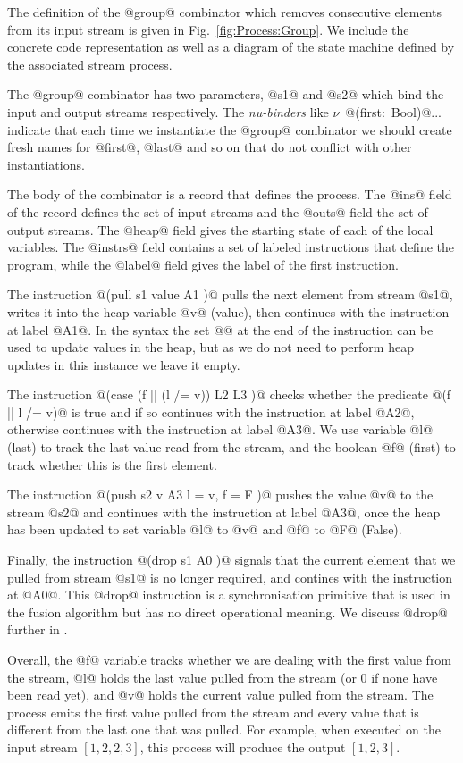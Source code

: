 The definition of the @group@ combinator which removes consecutive elements from its input stream is given in Fig.~\ref{fig:Process:Group}. We include the concrete code representation as well as a diagram of the state machine defined by the associated stream process.

The @group@ combinator has two parameters, @s1@ and @s2@ which bind the input and output streams respectively. The \emph{nu-binders} like \mbox{$\nu$ @(first: Bool)@...} indicate that each time we instantiate the @group@ combinator we should create fresh names for @first@, @last@ and so on that do not conflict with other instantiations. 

The body of the combinator is a record that defines the process. The @ins@ field of the record defines the set of input streams and the @outs@ field the set of output streams. The @heap@ field gives the starting state of each of the local variables. The @instrs@ field contains a set of labeled instructions that define the program, while the @label@ field gives the label of the first instruction. 

The instruction @(pull s1 value A1 {})@ pulls the next element from stream @s1@, writes it into the heap variable @v@ (value), then continues with the instruction at label @A1@. In the syntax the set @{}@ at the end of the instruction can be used to update values in the heap, but as we do not need to perform heap updates in this instance we leave it empty. 

The instruction @(case (f || (l /= v)) L2 {} L3 {})@ checks whether the predicate @(f || l /= v)@ is true and if so continues with the instruction at label @A2@, otherwise continues with the instruction at label @A3@. We use variable @l@ (last) to track the last value read from the stream, and the boolean @f@ (first) to track whether this is the first element.

The instruction @(push s2 v A3 { l = v, f = F })@ pushes the value @v@ to the stream @s2@ and continues with the instruction at label @A3@, once the heap has been updated to set variable @l@ to @v@ and @f@ to @F@ (False). 

Finally, the instruction @(drop s1 A0 {})@ signals that the current element that we pulled from stream @s1@ is no longer required, and contines with the instruction at @A0@. This @drop@ instruction is a synchronisation primitive that is used in the fusion algorithm but has no direct operational meaning. We discuss @drop@ further in . 

Overall, the @f@ variable tracks whether we are dealing with the first value from the stream, @l@ holds the last value pulled from the stream (or 0 if none have been read yet), and @v@ holds the current value pulled from the stream. The process emits the first value pulled from the stream and every value that is different from the last one that was pulled. For example, when executed on the input stream $[1, 2, 2, 3]$, this process will produce the output $[1, 2, 3]$.

